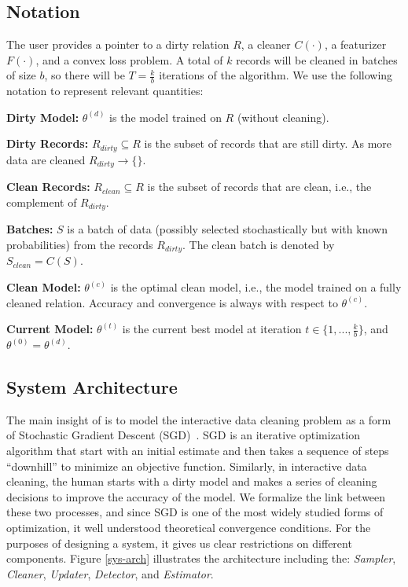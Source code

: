 \subsection{Notation}\label{notation}
The user provides a pointer to a dirty relation $R$, a cleaner $C(\cdot)$, a featurizer $F(\cdot)$, and a convex loss problem.
A total of $k$ records will be cleaned in batches of size $b$, so there will be $T = \frac{k}{b}$ iterations of the algorithm.  
We use the following notation to represent relevant quantities:

\vspace{0.25em}

\noindent\textbf{Dirty Model: } $\theta^{(d)}$ is the model trained on $R$ (without cleaning). 

\vspace{0.25em}

\noindent\textbf{Dirty Records: } $R_{dirty} \subseteq R$ is the subset of records that are still dirty. As more data are cleaned $R_{dirty} \rightarrow \{\}$.

\vspace{0.25em}

\noindent\textbf{Clean Records: } $R_{clean} \subseteq R$ is the subset of records that are clean, i.e., the complement of $R_{dirty}$.

\vspace{0.25em}

\noindent\textbf{Batches: } $S$ is a batch of data (possibly selected stochastically but with known probabilities) from the records $R_{dirty}$. The clean batch is denoted by $S_{clean} = C(S)$.

\vspace{0.25em}

\noindent\textbf{Clean Model: } $\theta^{(c)}$ is the optimal clean model, i.e., the model trained on a fully cleaned relation. Accuracy and convergence is always with respect to $\theta^{(c)}$.

\noindent\textbf{Current Model: } $\theta^{(t)}$ is the current best model at iteration $t \in \{1,...,\frac{k}{b}\}$, and $\theta^{(0)} = \theta^{(d)}$. 


\subsection{System Architecture}\label{syarch}
The main insight of \sys is to model the interactive data cleaning problem as a form of Stochastic Gradient Descent (SGD)~\cite{bottou2012stochastic}.
SGD is an iterative optimization algorithm that start with an initial estimate and then takes a sequence of steps ``downhill'' to minimize an objective function.
Similarly, in interactive data cleaning, the human starts with a dirty model and makes a series of cleaning decisions to improve the accuracy of the model.
We formalize the link between these two processes, and since SGD is one of the most widely studied forms of optimization, it well understood theoretical convergence conditions.
For the purposes of designing a system, it gives us clear restrictions on different components.
Figure \ref{sys-arch} illustrates the \sys architecture including the: {\it Sampler}, {\it Cleaner}, \emph{Updater}, {\it Detector}, and {\it Estimator}.

